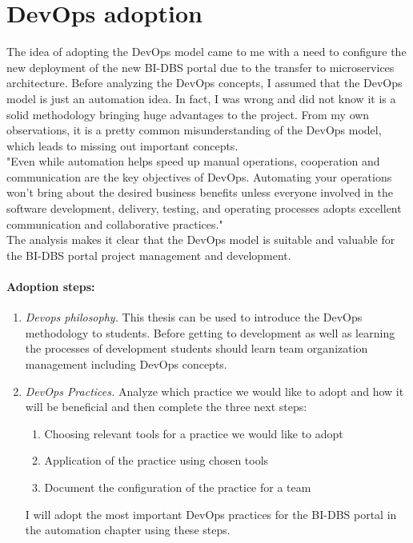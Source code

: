 \section{DevOps adoption} The idea of adopting the DevOps model came to me with a need to configure the new deployment of the new BI-DBS portal due to the transfer to microservices architecture. Before analyzing the DevOps concepts, I assumed that the DevOps model is just an automation idea. In fact, I was wrong and did not know it is a solid methodology bringing huge advantages to the project. From my own observations, it is a pretty common misunderstanding of the DevOps model, which leads to missing out important concepts.\\ 

\noindent "Even while automation helps speed up manual operations, cooperation and communication are the key objectives of DevOps. Automating your operations won’t bring about the desired business benefits unless everyone involved in the software development, delivery, testing, and operating processes adopts excellent communication and collaborative practices."\cite{devops-adoption}\\
The analysis makes it clear that the DevOps model is suitable and valuable for the BI-DBS portal project management and development.

\paragraph*{Adoption steps:} 


\begin{enumerate}
    \item \emph{Devops philosophy.} This thesis can be used to introduce the DevOps methodology to students. Before getting to development as well as learning the processes of development students should learn team organization management including DevOps concepts. 
    \item \emph{DevOps Practices.} Analyze which practice we would like to adopt and how it will be beneficial and then complete the three next steps:
        \begin{enumerate}
            \item Choosing relevant tools for a practice we would like to adopt
            \item Application of the practice using chosen tools
            \item Document the configuration of the practice for a team
        \end{enumerate}
    I will adopt the most important DevOps practices for the BI-DBS portal in the automation chapter using these steps.
\end{enumerate}


